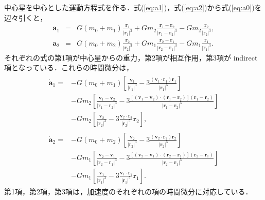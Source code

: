 \documentclass[11pt,a4paper,oneside,onecolumn]{jreport}
\begin{document}
中心星を中心とした運動方程式を作る．式(\ref{eq:a1})，式(\ref{eq:a2})から式(\ref{eq:a0})を辺々引くと，
\begin{eqnarray}
{\bm a}_1 & = & G (m_0 + m_1) \frac{{\bm r}_1}{|{\bm r}_1|^3} + G m_2 \frac{{\bm r}_1 - {\bm r}_2}{|{\bm r}_1 - {\bm r}_2|^3} - G m_2 \frac{{\bm r}_2}{|{\bm r}_2|^3}, \\
{\bm a}_2 & = & G (m_0 + m_2) \frac{{\bm r}_2}{|{\bm r}_2|^3} + G m_1 \frac{{\bm r}_2 - {\bm r}_1}{|{\bm r}_2 - {\bm r}_1|^3} - G m_1 \frac{{\bm r}_1}{|{\bm r}_1|^3}. 
\end{eqnarray}
それぞれの式の第1項が中心星からの重力，第2項が相互作用，第3項が indirect 項となっている．これらの時間微分は，
\begin{eqnarray}
\begin{split}
\dot{{\bm a}}_1 = & - G (m_0 + m_1) \left[ \frac{{\bm v}_1}{|{\bm r}_1|^3} - 3 \frac{({\bm v}_1 \cdot {\bm r}_1) {\bm r}_1}{|{\bm r}_1|^5} \right] \\
& - G m_2 \left[ \frac{{\bm v}_1 - {\bm v}_2}{|{\bm r}_1 - {\bm r}_2|^3} - 3 \frac{[({\bm v}_1 - {\bm v}_2) \cdot ({\bm r}_1 - {\bm r}_2)] ({\bm r}_1 - {\bm r}_2)}{|{\bm r}_1 - {\bm r}_2|^5} \right] \\
& - G m_2 \left[ \frac{{\bm v}_2}{|{\bm r}_2|^3} - 3 \frac{{\bm v}_2 \cdot {\bm r}_2}{|{\bm r}_2|^5} {\bm r}_2 \right], 
\end{split}
\\
\begin{split}
\dot{{\bm a}}_2 = & - G (m_0 + m_2) \left[ \frac{{\bm v}_2}{|{\bm r}_2|^3} - 3 \frac{({\bm v}_2 \cdot {\bm r}_2) {\bm r}_2}{|{\bm r}_2|^5} \right] \\
& - G m_1 \left[ \frac{{\bm v}_2 - {\bm v}_1}{|{\bm r}_2 - {\bm r}_1|^3} - 3 \frac{[({\bm v}_2 - {\bm v}_1) \cdot ({\bm r}_2 - {\bm r}_1)] ({\bm r}_2 - {\bm r}_1)}{|{\bm r}_2 - {\bm r}_1|^5} \right] \\
& - G m_1 \left[ \frac{{\bm v}_1}{|{\bm r}_1|^3} - 3 \frac{{\bm v}_1 \cdot {\bm r}_1}{|{\bm r}_1|^5} {\bm r}_1 \right].
\end{split}
\end{eqnarray}
第1項，第2項，第3項は，加速度のそれぞれの項の時間微分に対応している．
\end{document}
